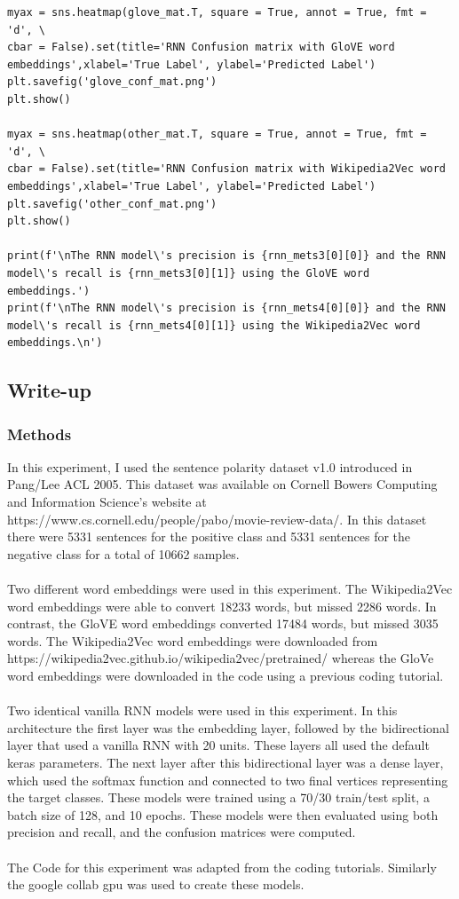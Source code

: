 \documentclass[12pt]{article}
\begin{document}
\begin{lstlisting}[breaklines]
myax = sns.heatmap(glove_mat.T, square = True, annot = True, fmt = 'd', \
cbar = False).set(title='RNN Confusion matrix with GloVE word embeddings',xlabel='True Label', ylabel='Predicted Label')
plt.savefig('glove_conf_mat.png')
plt.show()

myax = sns.heatmap(other_mat.T, square = True, annot = True, fmt = 'd', \
cbar = False).set(title='RNN Confusion matrix with Wikipedia2Vec word embeddings',xlabel='True Label', ylabel='Predicted Label')
plt.savefig('other_conf_mat.png')
plt.show()

print(f'\nThe RNN model\'s precision is {rnn_mets3[0][0]} and the RNN model\'s recall is {rnn_mets3[0][1]} using the GloVE word embeddings.')
print(f'\nThe RNN model\'s precision is {rnn_mets4[0][0]} and the RNN model\'s recall is {rnn_mets4[0][1]} using the Wikipedia2Vec word embeddings.\n')
\end{lstlisting}
\subsection{Write-up}
\subsubsection{Methods}
In this experiment, I used the sentence polarity dataset v1.0 introduced in Pang/Lee ACL 2005. This dataset was available on Cornell Bowers Computing and Information Science's website at https://www.cs.cornell.edu/people/pabo/movie-review-data/. In this dataset there were 5331 sentences for the positive class and 5331 sentences for the negative class for a total of 10662 samples.\\
\\
Two different word embeddings were used in this experiment. The Wikipedia2Vec word embeddings were able to convert 18233 words, but missed 2286 words. In contrast, the GloVE word embeddings converted 17484 words, but missed 3035 words. The Wikipedia2Vec word embeddings were downloaded from https://wikipedia2vec.github.io/wikipedia2vec/pretrained/ whereas the GloVe word embeddings were downloaded in the code using a previous coding tutorial.\\
\\
Two identical vanilla RNN models were used in this experiment. In this architecture the first layer was the embedding layer, followed by the bidirectional layer that used a vanilla RNN with 20 units. These layers all used the default keras parameters. The next layer after this bidirectional layer was a dense layer, which used the softmax function and connected to two final vertices representing the target classes. These models were trained using a 70/30 train/test split, a batch size of 128, and 10 epochs. These models were then evaluated using both precision and recall, and the confusion matrices were computed.\\
\\
The Code for this experiment was adapted from the coding tutorials. Similarly the google collab gpu was used to create these models.
\end{document}
